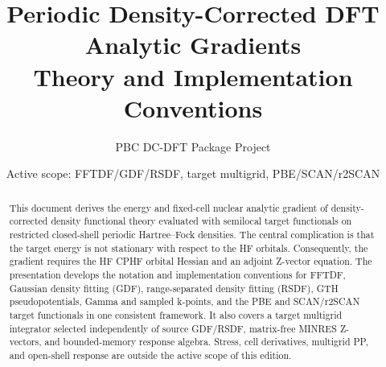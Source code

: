 \documentclass[11pt,a4paper]{article}
\title{Periodic Density-Corrected DFT Analytic Gradients\\
Theory and Implementation Conventions}
\author{PBC DC-DFT Package Project}
\date{Active scope: FFTDF/GDF/RSDF, target multigrid, PBE/SCAN/r2SCAN}
\theoremstyle{definition}
\begin{document}
\maketitle
\begin{abstract}
This document derives the energy and fixed-cell nuclear analytic gradient of
density-corrected density functional theory evaluated with semilocal target
functionals on restricted closed-shell periodic Hartree--Fock densities.  The
central complication is that the target energy is not stationary with respect
to the HF orbitals.  Consequently, the gradient requires the HF CPHF orbital
Hessian and an adjoint Z-vector equation.  The presentation develops the
notation and implementation conventions for FFTDF, Gaussian density fitting
(GDF), range-separated density fitting (RSDF), GTH pseudopotentials, Gamma and
sampled k-points, and the PBE and SCAN/r2SCAN target functionals in one
consistent framework.  It also covers a target multigrid integrator selected
independently of source GDF/RSDF, matrix-free MINRES Z-vectors, and
bounded-memory response algebra.  Stress, cell derivatives, multigrid PP, and
open-shell response are outside the active scope of this edition.
\end{abstract}
\tableofcontents

















\end{document}
